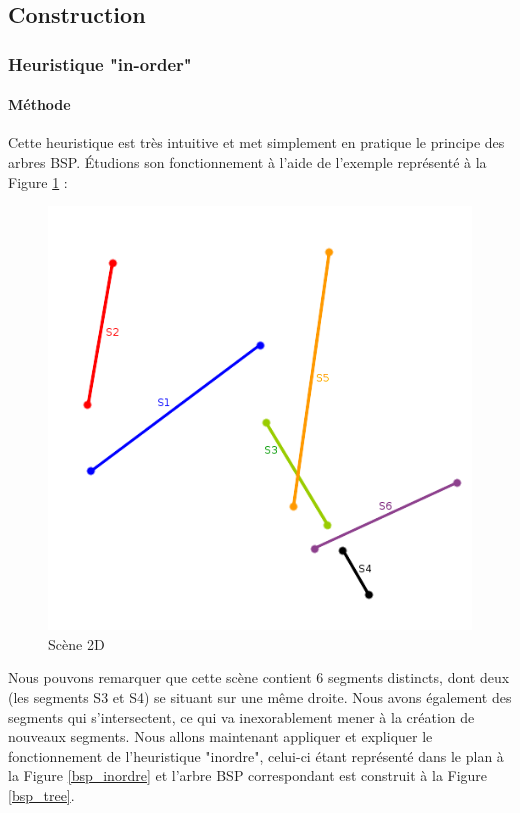\documentclass[11pt,a4paper]{article}
\begin{document}
\subsection{Construction}
\subsubsection{Heuristique "in-order"}

\paragraph{Méthode}

Cette heuristique est très intuitive et met simplement en pratique le principe des arbres BSP. Étudions son fonctionnement à l'aide de l'exemple représenté à la Figure \ref{scene_inordre} : 

\begin{figure}[!h]
\centering
\includegraphics[scale=0.6]{bsp_ex_1.png}
\caption{Scène 2D}
\label{scene_inordre}
\end{figure}

Nous pouvons remarquer que cette scène contient 6 segments distincts, dont deux (les segments S3 et S4) se situant sur une même droite. Nous avons également des segments qui s'intersectent, ce qui va inexorablement mener à la création de nouveaux segments. Nous allons maintenant appliquer et expliquer le fonctionnement de l'heuristique "inordre", celui-ci étant représenté dans le plan à la Figure \ref{bsp_inordre} et l'arbre BSP correspondant est construit à la Figure \ref{bsp_tree}. \\
\end{document}
